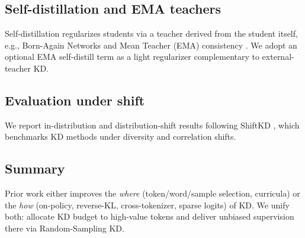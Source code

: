 \documentclass[11pt]{article}
\begin{document}
\subsection{Self-distillation and EMA teachers} Self-distillation regularizes students via a teacher derived from the student itself, e.g., Born-Again Networks \citep{furlanello2018ban} and Mean Teacher (EMA) consistency \citep{tarvainen2017meanteacher}. We adopt an optional EMA self-distill term as a light regularizer complementary to external-teacher KD.

\subsection{Evaluation under shift} We report in-distribution and distribution-shift results following ShiftKD \citep{zhang2023shiftkd}, which benchmarks KD methods under diversity and correlation shifts.

\subsection{Summary} Prior work either improves the \emph{where} (token/word/sample selection, curricula) or the \emph{how} (on-policy, reverse-KL, cross-tokenizer, sparse logits) of KD. We unify both: allocate KD budget to high-value tokens and deliver unbiased supervision there via Random-Sampling KD.




\appendix
\end{document}

